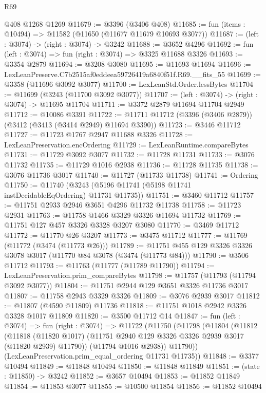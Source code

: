 \begin{lexlean}{R69}
\begin{coremodule}
    @408
    @1268
    @1269
@11679 := @3396 (@3406 @408)
@11685 := fun (items : @10494) => @11582 (@11650 (@11677 @11679 @10693 @3077))
@11687 := (left : @3074) -> (right : @3074) -> @3242
@11688 := @3652 @4296
@11692 := fun (left : @3074) => fun (right : @3074) => @3325 @11688 @3326
@11693 := @3354 @2879
@11694 := @3208 @3080
@11695 := @11693 @11694
@11696 := LexLeanPreserve.C7b2515af0eddeea59726419a6840f51f.R69.__fits_55
@11699 := @3358 (@11696 @3092 @3077)
@11700 := LexLeanStd.Order.lessBytes
@11704 := @11699 (@3243 (@11700 @3092 @3077))
@11707 := (left : @3074) -> (right : @3074) -> @11695 @11704
@11711 := @3372 @2879 @11694 @11704 @2949
@11712 := @10086 @3391
@11722 := @11711 @11712 (@3396 (@3406 @2879)) (@3412 (@3413 (@3414 @2949) @11694 @3390))
@11723 := @3446 @11712
@11727 := @11723 @1767 @2947 @11688 @3326
@11728 := LexLeanPreservation.encOrdering
@11729 := LexLeanRuntime.compareBytes
@11731 := @11729 @3092 @3077
@11732 := @11728 @11731
@11733 := @3076 @11732
@11735 := @11729 @1016 @2938
@11736 := @11728 @11735
@11738 := @3076 @11736 @3017
@11740 := @11727 (@11733 @11738)
@11741 := Ordering
@11750 := @11740 (@3243 (@5196 @11741 (@5198 @11741 instDecidableEqOrdering) @11731 @11735))
@11751 := @3460 @11712
@11757 := @11751 @2933 @2946 @3651 @4296 @11732 @11738
@11758 := @11723 @2931
@11763 := @11758 @1466 @3329 @3326 @11694 @11732
@11769 := @11751 @127 @457 @3326 @3328 @3207 @3080
@11770 := @3469 @11712
@11772 := @11770 @26 @3207
@11773 := @3475 @11712
@11777 := @11769 (@11772 (@3474 (@11773 @26)))
@11789 := @11751 @455 @129 @3326 @3326 @3078 @3017 (@11770 @84 @3078 (@3474 (@11773 @84)))
@11790 := @3506 @11712
@11793 := @11763 (@11777 (@11789 @11790))
@11794 := LexLeanPreservation.prim_compareBytes
@11798 := @11757 (@11793 (@11794 @3092 @3077))
@11804 := @11751 @2944 @129 @3651 @3326 @11736 @3017
@11807 := @11758 @2943 @3329 @3326
@11809 := @3076 @2939 @3017
@11812 := @11807 (@4590 @11809) @11736
@11818 := @11751 @1018 @2942 @3326 @3328 @1017 @11809
@11820 := @3500 @11712 @14
@11847 := fun (left : @3074) =>
  fun (right : @3074) =>
  @11722
    (@11750
      (@11798
        (@11804
          (@11812
            (@11818
              (@11820 @1017)
              (@11751 @2940 @129 @3326 @3326 @2939 @3017 (@11820 @2939) @11790))
            (@11794 @1016 @2938))
          @11790))
      (LexLeanPreservation.prim_equal_ordering @11731 @11735))
@11848 := @3377 @10494
@11849 := @11848 @10494
@11850 := @11848 @11849
@11851 := (state : @11850) -> @3242
@11852 := @3657 @10494
@11853 := @11852 @11849
@11854 := @11853 @3077
@11855 := @10500 @11854
@11856 := @11852 @10494

\end{coremodule}
\end{lexlean}
